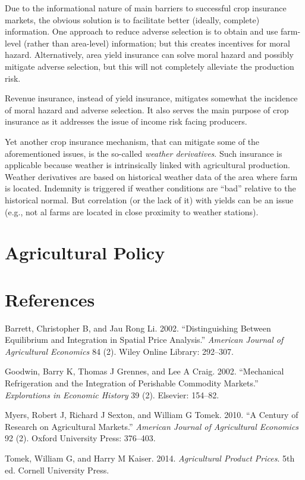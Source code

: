 \documentclass[]{book}
\begin{document}
Due to the informational nature of main barriers to successful crop
insurance markets, the obvious solution is to facilitate better
(ideally, complete) information. One approach to reduce adverse
selection is to obtain and use farm-level (rather than area-level)
information; but this creates incentives for moral hazard.
Alternatively, area yield insurance can solve moral hazard and possibly
mitigate adverse selection, but this will not completely alleviate the
production risk.

Revenue insurance, instead of yield insurance, mitigates somewhat the
incidence of moral hazard and adverse selection. It also serves the main
purpose of crop insurance as it addresses the issue of income risk
facing producers.

Yet another crop insurance mechanism, that can mitigate some of the
aforementioned issues, is the so-called \emph{weather derivatives}. Such
insurance is applicable because weather is intrinsically linked with
agricultural production. Weather derivatives are based on historical
weather data of the area where farm is located. Indemnity is triggered
if weather conditions are ``bad'' relative to the historical normal. But
correlation (or the lack of it) with yields can be an issue (e.g., not
al farms are located in close proximity to weather stations).

\chapter{Agricultural Policy}\label{agricultural-policy}

\chapter*{References}\label{references}

\hypertarget{refs}{}
\hypertarget{ref-barrett2002}{}
Barrett, Christopher B, and Jau Rong Li. 2002. ``Distinguishing Between
Equilibrium and Integration in Spatial Price Analysis.'' \emph{American
Journal of Agricultural Economics} 84 (2). Wiley Online Library:
292--307.

\hypertarget{ref-goodwin2002}{}
Goodwin, Barry K, Thomas J Grennes, and Lee A Craig. 2002. ``Mechanical
Refrigeration and the Integration of Perishable Commodity Markets.''
\emph{Explorations in Economic History} 39 (2). Elsevier: 154--82.

\hypertarget{ref-myers2010}{}
Myers, Robert J, Richard J Sexton, and William G Tomek. 2010. ``A
Century of Research on Agricultural Markets.'' \emph{American Journal of
Agricultural Economics} 92 (2). Oxford University Press: 376--403.

\hypertarget{ref-tomek2014}{}
Tomek, William G, and Harry M Kaiser. 2014. \emph{Agricultural Product
Prices}. 5th ed. Cornell University Press.
\end{document}
